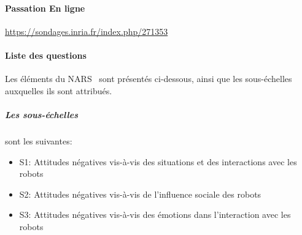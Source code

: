 \paragraph{Passation En ligne}\label{pdf:nars}
\url{https://sondages.inria.fr/index.php/271353}

\paragraph{Liste des questions}
\par%

Les éléments du NARS~\cite{nomura2006measurement} sont présentés ci-dessous, ainsi que les sous-échelles auxquelles ils sont attribués. 

\subparagraph{Les sous-échelles} sont les suivantes: 
\begin{itemize}
    \item S1: Attitudes négatives vis-à-vis des situations et des interactions avec les robots
    \item S2: Attitudes négatives vis-à-vis de l'influence sociale des robots
    \item S3: Attitudes négatives vis-à-vis des émotions dans l'interaction avec les robots
\end{itemize}{}


